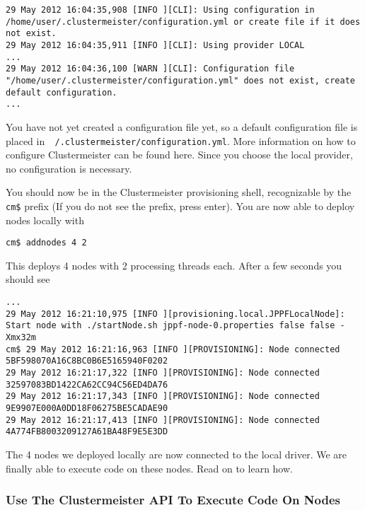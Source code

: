 \documentclass{article}
\begin{document}
\begin{lstlisting}[breaklines=true, backgroundcolor=\color{lbcolor}]
29 May 2012 16:04:35,908 [INFO ][CLI]: Using configuration in /home/user/.clustermeister/configuration.yml or create file if it does not exist.
29 May 2012 16:04:35,911 [INFO ][CLI]: Using provider LOCAL
...
29 May 2012 16:04:36,100 [WARN ][CLI]: Configuration file "/home/user/.clustermeister/configuration.yml" does not exist, create default configuration.
... 
\end{lstlisting}

You have not yet created a configuration file yet, so a default configuration file is placed in\texttt{ ~/.clustermeister/configuration.yml}. More information on how to configure Clustermeister can be found here. Since you choose the local provider, no configuration is necessary.

You should now be in the Clustermeister provisioning shell, recognizable by the \texttt{cm\$} prefix (If you do not see the prefix, press enter). You are now able to deploy nodes locally with

\begin{lstlisting}[breaklines=true, backgroundcolor=\color{lbcolor}]
cm$ addnodes 4 2
\end{lstlisting}

This deploys 4 nodes with 2 processing threads each. After a few seconds you should see

\begin{lstlisting}[breaklines=true, backgroundcolor=\color{lbcolor}]
...
29 May 2012 16:21:10,975 [INFO ][provisioning.local.JPPFLocalNode]: Start node with ./startNode.sh jppf-node-0.properties false false -Xmx32m
cm$ 29 May 2012 16:21:16,963 [INFO ][PROVISIONING]: Node connected 5BF598070A16C8BC0B6E5165940F0202
29 May 2012 16:21:17,322 [INFO ][PROVISIONING]: Node connected 32597083BD1422CA62CC94C56ED4DA76
29 May 2012 16:21:17,343 [INFO ][PROVISIONING]: Node connected 9E9907E000A0DD18F06275BE5CADAE90
29 May 2012 16:21:17,413 [INFO ][PROVISIONING]: Node connected 4A774FB8003209127A61BA48F9E5E3DD
\end{lstlisting}

The 4 nodes we deployed locally are now connected to the local driver. We are finally able to execute code on these nodes. Read on to learn how.

\subsubsection{Use The Clustermeister API To Execute Code On Nodes}
\end{document}
